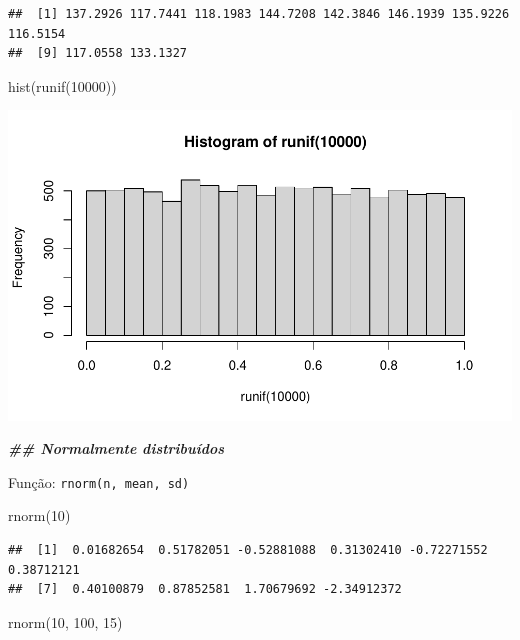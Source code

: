 \documentclass[
]{article}
\newenvironment{Shaded}{\begin{snugshade}}{\end{snugshade}}
\newcommand{\DecValTok}[1]{\textcolor[rgb]{0.00,0.00,0.81}{#1}}
\newcommand{\DocumentationTok}[1]{\textcolor[rgb]{0.56,0.35,0.01}{\textbf{\textit{#1}}}}
\newcommand{\FunctionTok}[1]{\textcolor[rgb]{0.00,0.00,0.00}{#1}}
\newcommand{\NormalTok}[1]{#1}
\begin{document}
\begin{verbatim}
##  [1] 137.2926 117.7441 118.1983 144.7208 142.3846 146.1939 135.9226 116.5154
##  [9] 117.0558 133.1327
\end{verbatim}

\begin{Shaded}
\begin{Highlighting}[]
\FunctionTok{hist}\NormalTok{(}\FunctionTok{runif}\NormalTok{(}\DecValTok{10000}\NormalTok{))}
\end{Highlighting}
\end{Shaded}

\includegraphics{DistNormal_files/figure-latex/unnamed-chunk-6-1.pdf}

\begin{Shaded}
\begin{Highlighting}[]
\DocumentationTok{\#\# Normalmente distribuídos}
\end{Highlighting}
\end{Shaded}

Função: \texttt{rnorm(n,\ mean,\ sd)}

\begin{Shaded}
\begin{Highlighting}[]
\FunctionTok{rnorm}\NormalTok{(}\DecValTok{10}\NormalTok{)}
\end{Highlighting}
\end{Shaded}

\begin{verbatim}
##  [1]  0.01682654  0.51782051 -0.52881088  0.31302410 -0.72271552  0.38712121
##  [7]  0.40100879  0.87852581  1.70679692 -2.34912372
\end{verbatim}

\begin{Shaded}
\begin{Highlighting}[]
\FunctionTok{rnorm}\NormalTok{(}\DecValTok{10}\NormalTok{, }\DecValTok{100}\NormalTok{, }\DecValTok{15}\NormalTok{)}
\end{Highlighting}
\end{Shaded}
\end{document}
